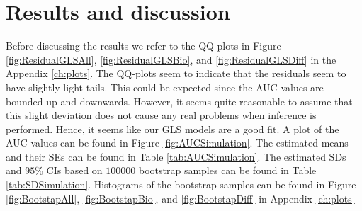 \section{Results and discussion}
\label{sec:SimResults}
Before discussing the results we refer to the QQ-plots in Figure \ref{fig:ResidualGLSAll}, \ref{fig:ResidualGLSBio}, and \ref{fig:ResidualGLSDiff} in the Appendix \ref{ch:plots}. The QQ-plots seem to indicate that the residuals seem to have slightly light tails. This could be expected since the AUC values are bounded up and downwards. However, it seems quite reasonable to assume that this slight deviation does not cause any real problems when inference is performed. Hence, it seems like our GLS models are a good fit. A plot of the AUC values can be found in Figure \ref{fig:AUCSimulation}. The estimated means and their SEs can be found in Table \ref{tab:AUCSimulation}. The estimated SDs and $95$\% CIs based on $100000$ bootstrap samples can be found in Table \ref{tab:SDSimulation}. Histograms of the bootstrap samples can be found in Figure \ref{fig:BootstapAll}, \ref{fig:BootstapBio}, and \ref{fig:BootstapDiff} in Appendix \ref{ch:plots}\\

